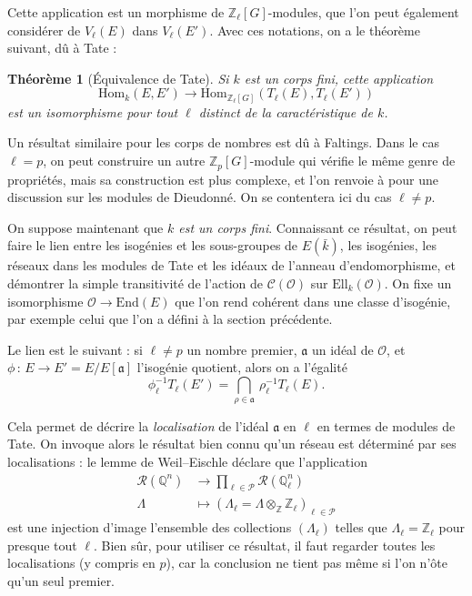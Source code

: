 \documentclass[11pt,a4paper]{article}
\newcommand{\Z}{\mathbb{Z}}
\newcommand{\Q}{\mathbb{Q}}
\renewcommand{\O}{\mathcal{O}}
\newcommand{\Cl}{\mathcal{C}}
\newcommand{\vers}{\longrightarrow}
\newcommand{\End}{\mathrm{End}}
\newcommand{\Hom}{\mathrm{Hom}}
\newcommand{\Ell}{\mathrm{Ell}}
\renewcommand{\frak}{\mathfrak}
\newcommand{\de}{\,:\,}
\newtheorem*{thm}{Théorème}
\theoremstyle{definition}
\begin{document}
Cette application est un morphisme de $\Z_\ell[G]$-modules, que l'on peut également considérer de $V_\ell(E)$ dans $V_\ell(E')$. Avec ces notations, on a le théorème suivant, dû à Tate :

\begin{thm}[Équivalence de Tate] Si $k$ est un corps fini, cette application
$$\Hom_k(E, E') \vers \Hom_{\Z_\ell[G]} (T_\ell(E), T_\ell(E'))$$
est un isomorphisme pour tout $\ell$ distinct de la caractéristique de $k$.
\end{thm}

Un résultat similaire pour les corps de nombres est dû à Faltings. Dans le cas $\ell=p$, on peut construire un autre $\Z_p[G]$-module qui vérifie le même genre de propriétés, mais sa construction est plus complexe, et l'on renvoie à \cite{Waterhouse} pour une discussion sur les modules de Dieudonné. On se contentera ici du cas $\ell\neq p$.

On suppose maintenant que \emph{$k$ est un corps fini}. Connaissant ce résultat, on peut faire le lien entre les isogénies et les sous-groupes de $E(\bar{k})$, les isogénies, les réseaux dans les modules de Tate et les idéaux de l'anneau d'endomorphisme, et démontrer la simple transitivité de l'action de $\Cl(\O)$ sur $\Ell_k(\O)$. On fixe un isomorphisme $\O\vers \End(E)$ que l'on rend cohérent dans une classe d'isogénie, par exemple celui que l'on a défini à la section précédente.

Le lien est le suivant : si $\ell\neq p$ un nombre premier, $\frak a$ un idéal de $\O$, et $\phi\de E\vers E' = E/E[\frak a]$ l'isogénie quotient, alors on a l'égalité
$$\phi_\ell^{-1} T_\ell(E') = \bigcap_{\rho\in\frak a}\ \rho_\ell^{-1} T_\ell(E) .$$

Cela permet de décrire la \emph{localisation} de l'idéal $\frak a$ en $\ell$ en termes de modules de Tate. On invoque alors le résultat bien connu qu'un réseau est déterminé par ses localisations : le lemme de Weil--Eischle déclare que l'application
$$\begin{aligned}
\mathcal{R}(\Q^n) &\longrightarrow \prod_{\ell\in \mathcal{P}} \mathcal{R}(\Q_\ell^n) \\
\Lambda\ \ &\longmapsto (\Lambda_\ell = \Lambda\otimes_\Z \Z_\ell)_{\ell\in\mathcal{P}}
\end{aligned}$$
est une injection d'image l'ensemble des collections $(\Lambda_\ell)$ telles que $\Lambda_\ell = \Z_\ell$ pour presque tout $\ell$. Bien sûr, pour utiliser ce résultat, il faut regarder toutes les localisations (y compris en $p$), car la conclusion ne tient pas même si l'on n'ôte qu'un seul premier.
\end{document}
